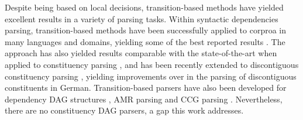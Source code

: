 \documentclass[11pt]{article}
\newcommand{\daniel}[1]{\footnote{\color{blue} #1}}
\begin{document}
Despite being based on local decisions, transition-based methods have yielded excellent
results in a variety of parsing tasks. Within syntactic dependencies parsing, transition-based methods
have been successfully applied to corproa in many languages and domains, yielding some
of the best reported results \cite{dyer2015transition,ballesteros2015improved}. 
The approach has also yielded results comparable with the state-of-the-art when applied
to constituency parsing \cite{sagae2005classifier,zhu2013fast}, and has been recently extended to
discontiguous constituency parsing \cite{maier2015discontinuous},
yielding improvements over in the parsing of discontiguous constituents in German.
Transition-based parsers have also been developed for dependency DAG structures
\cite{sagae2008shift,tokgoz2015transition}, AMR parsing \cite{wang2015transition}
and CCG parsing \cite{ambati2015incremental}.
Nevertheless, there are no constituency DAG parsers, a gap this work addresses.



\end{document}
